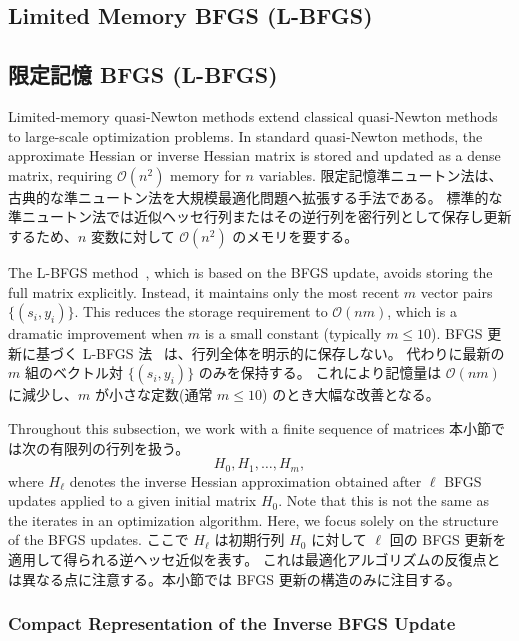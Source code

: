 \documentclass[0_main]{subfiles}
\begin{document}
\ifEn
    \subsection{Limited Memory BFGS (L-BFGS)}
\else
    \subsection{限定記憶 BFGS (L-BFGS)}
\fi

\ifEn
    Limited-memory quasi-Newton methods extend classical quasi-Newton methods to large-scale optimization problems.
    In standard quasi-Newton methods, the approximate Hessian or inverse Hessian matrix is stored and updated as a dense matrix, requiring $\mathcal{O}(n^2)$ memory for $n$ variables.
\else
    限定記憶準ニュートン法は、古典的な準ニュートン法を大規模最適化問題へ拡張する手法である。
    標準的な準ニュートン法では近似ヘッセ行列またはその逆行列を密行列として保存し更新するため、$n$ 変数に対して $\mathcal{O}(n^2)$ のメモリを要する。
\fi

\ifEn
    The L-BFGS method~\citep{liuLimitedMemoryBFGS1989a}, which is based on the BFGS update, avoids storing the full matrix explicitly.
    Instead, it maintains only the most recent $m$ vector pairs $\{(s_i,y_i)\}$.
    This reduces the storage requirement to $\mathcal{O}(nm)$, which is a dramatic improvement when $m$ is a small constant (typically $m\le 10$).
\else
    BFGS 更新に基づく L-BFGS 法~\citep{liuLimitedMemoryBFGS1989a} は、行列全体を明示的に保存しない。
    代わりに最新の $m$ 組のベクトル対 $\{(s_i,y_i)\}$ のみを保持する。
    これにより記憶量は $\mathcal{O}(nm)$ に減少し、$m$ が小さな定数(通常 $m\le 10$) のとき大幅な改善となる。
\fi

\ifEn
    Throughout this subsection, we work with a finite sequence of matrices
\else
    本小節では次の有限列の行列を扱う。
\fi
\begin{equation*}
    H_0, H_1, \dots, H_m,
\end{equation*}
\ifEn
    where $H_\ell$ denotes the inverse Hessian approximation obtained after $\ell$ BFGS updates applied to a given initial matrix $H_0$.
    Note that this is not the same as the iterates in an optimization algorithm. Here, we focus solely on the structure of the BFGS updates.
\else
    ここで $H_\ell$ は初期行列 $H_0$ に対して $\ell$ 回の BFGS 更新を適用して得られる逆ヘッセ近似を表す。
    これは最適化アルゴリズムの反復点とは異なる点に注意する。本小節では BFGS 更新の構造のみに注目する。
\fi

\ifEn
    \subsubsection{Compact Representation of the Inverse BFGS Update}
\else
\end{document}
